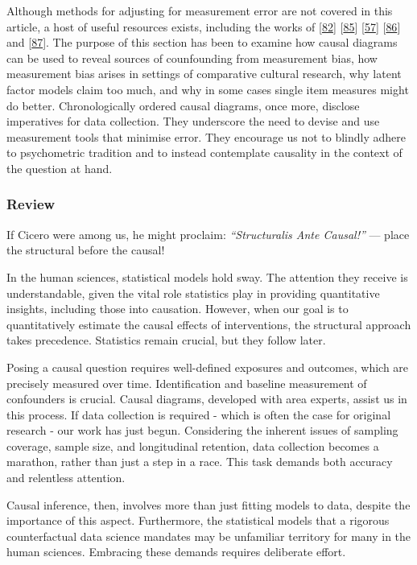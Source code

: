 \documentclass[
  singlecolumn]{article}
\begin{document}
Although methods for adjusting for measurement error are not covered in
this article, a host of useful resources exists, including the works of
{[}\protect\hyperlink{ref-keogh2020}{82}{]}
{[}\protect\hyperlink{ref-buonaccorsi2010}{85}{]}
{[}\protect\hyperlink{ref-shi2021}{57}{]}
{[}\protect\hyperlink{ref-valeri2014}{86}{]} and
{[}\protect\hyperlink{ref-bandalos2018}{87}{]}. The purpose of this
section has been to examine how causal diagrams can be used to reveal
sources of counfounding from measurement bias, how measurement bias
arises in settings of comparative cultural research, why latent factor
models claim too much, and why in some cases single item measures might
do better. Chronologically ordered causal diagrams, once more, disclose
imperatives for data collection. They underscore the need to devise and
use measurement tools that minimise error. They encourage us not to
blindly adhere to psychometric tradition and to instead contemplate
causality in the context of the question at hand.

\hypertarget{review}{%
\subsubsection{Review}\label{review}}

If Cicero were among us, he might proclaim: \emph{``Structuralis Ante
Causal!''} --- place the structural before the causal!

In the human sciences, statistical models hold sway. The attention they
receive is understandable, given the vital role statistics play in
providing quantitative insights, including those into causation.
However, when our goal is to quantitatively estimate the causal effects
of interventions, the structural approach takes precedence. Statistics
remain crucial, but they follow later.

Posing a causal question requires well-defined exposures and outcomes,
which are precisely measured over time. Identification and baseline
measurement of confounders is crucial. Causal diagrams, developed with
area experts, assist us in this process. If data collection is required
- which is often the case for original research - our work has just
begun. Considering the inherent issues of sampling coverage, sample
size, and longitudinal retention, data collection becomes a marathon,
rather than just a step in a race. This task demands both accuracy and
relentless attention.

Causal inference, then, involves more than just fitting models to data,
despite the importance of this aspect. Furthermore, the statistical
models that a rigorous counterfactual data science mandates may be
unfamiliar territory for many in the human sciences. Embracing these
demands requires deliberate effort.
\end{document}
